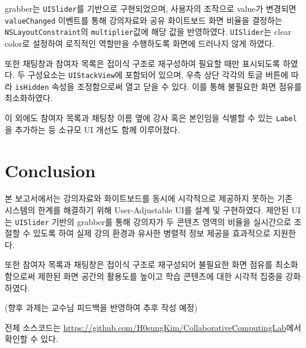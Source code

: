 \documentclass[pdflatex,sn-mathphys-num]{sn-jnl}%
\theoremstyle{thmstyleone}%
\theoremstyle{thmstyletwo}%
\theoremstyle{thmstylethree}%
\begin{document}
grabber는 \verb+UISlider+\cite{UISlider}를 기반으로 구현되었으며, 사용자의 조작으로 value가 변경되면 \verb+valueChanged+ 이벤트를 통해 강의자료와 공유 화이트보드 화면 비율을 결정하는 \verb+NSLayoutConstraint+의 \verb+multiplier+값에 해당 값을 반영하였다. \verb+UISlider+는 clear color로 설정하여 로직적인 역할만을 수행하도록 화면에 드러나지 않게 하였다.

또한 채팅창과 참여자 목록은 접이식 구조로 재구성하여 필요할 때만 표시되도록 하였다. 두 구성요소는 \verb+UIStackView+에 포함되어 있으며, 우측 상단 각각의 토글 버튼에 따라 \verb+isHidden+ 속성을 조정함으로써 열고 닫을 수 있다. 이를 통해 불필요한 화면 점유를 최소화하였다.

이 외에도 참여자 목록과 채팅창 이름 옆에 강사 혹은 본인임을 식별할 수 있는 \verb+Label+을 추가하는 등 소규모 UI 개선도 함께 이루어졌다.

\section{Conclusion}\label{sec3}

본 보고서에서는 강의자료와 화이트보드를 동시에 시각적으로 제공하지 못하는 기존 시스템의 한계를 해결하기 위해 User-Adjustable UI를 설계 및 구현하였다. 제안된 UI는 \verb+UISlider+ 기반의 grabber를 통해 강의자가 두 콘텐츠 영역의 비율을 실시간으로 조절할 수 있도록 하여 실제 강의 환경과 유사한 병렬적 정보 제공을 효과적으로 지원한다.

또한 참여자 목록과 채팅창은 접이식 구조로 재구성되어 불필요한 화면 점유를 최소화함으로써 제한된 화면 공간의 활용도를 높이고 학습 콘텐츠에 대한 시각적 집중을 강화하였다.

(향후 과제는 교수님 피드백을 반영하여 추후 작성 예정)

전체 소스코드는 \href{https://github.com/H0sungKim/CollaborativeComputingLab}{https://github.com/H0sungKim/CollaborativeComputingLab}에서 확인할 수 있다.



\end{document}
